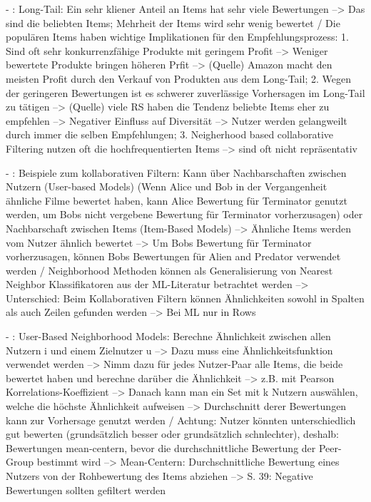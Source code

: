 - \cite[S. 32]{recommenderSystems:2016}: Long-Tail: Ein sehr kliener Anteil an Items hat sehr viele Bewertungen --> Das sind die beliebten Items; Mehrheit der Items wird sehr wenig bewertet / Die populären Items haben wichtige Implikationen für den Empfehlungsprozess: 1. Sind oft sehr konkurrenzfähige Produkte mit geringem Profit --> Weniger bewertete Produkte bringen höheren Prfit --> (Quelle) Amazon macht den meisten Profit durch den Verkauf von Produkten aus dem Long-Tail; 2. Wegen der geringeren Bewertungen ist es schwerer zuverlässige Vorhersagen im Long-Tail zu tätigen --> (Quelle) viele RS haben die Tendenz beliebte Items eher zu empfehlen --> Negativer Einfluss auf Diversität --> Nutzer werden gelangweilt durch immer die selben Empfehlungen; 3. Neigherhood based collaborative Filtering nutzen oft die hochfrequentierten Items --> sind oft nicht repräsentativ

- \cite[S. 33]{recommenderSystems:2016}: Beispiele zum kollaborativen Filtern: Kann über Nachbarschaften zwischen Nutzern (User-based Models) (Wenn Alice und Bob in der Vergangenheit ähnliche Filme bewertet haben, kann Alice Bewertung für Terminator genutzt werden, um Bobs nicht vergebene Bewertung für Terminator vorherzusagen) oder Nachbarschaft zwischen Items (Item-Based Models) --> Ähnliche Items werden vom Nutzer ähnlich bewertet --> Um Bobs Bewertung für Terminator vorherzusagen, können Bobs Bewertungen für Alien and Predator verwendet werden / Neighborhood Methoden können als Generalisierung von Nearest Neighbor Klassifikatoren aus der ML-Literatur betrachtet werden --> Unterschied: Beim Kollaborativen Filtern können Ähnlichkeiten sowohl in Spalten als auch Zeilen gefunden werden --> Bei ML nur in Rows

- \cite[S. 34f.]{recommenderSystems:2016}: User-Based Neighborhood Models: Berechne Ähnlichkeit zwischen allen Nutzern i und einem Zielnutzer u --> Dazu muss eine Ähnlichkeitsfunktion verwendet werden --> Nimm dazu für jedes Nutzer-Paar alle Items, die beide bewertet haben und berechne darüber die Ähnlichkeit --> z.B. mit Pearson Korrelations-Koeffizient --> Danach kann man ein Set mit k Nutzern auswählen, welche die höchste Ähnlichkeit aufweisen --> Durchschnitt derer Bewertungen kann zur Vorhersage genutzt werden / Achtung: Nutzer könnten unterschiedlich gut bewerten (grundsätzlich besser oder grundsätzlich schnlechter), deshalb: Bewertungen mean-centern, bevor die durchschnittliche Bewertung der Peer-Group bestimmt wird --> Mean-Centern: Durchschnittliche Bewertung eines Nutzers von der Rohbewertung des Items abziehen --> S. 39: Negative Bewertungen sollten gefiltert werden

